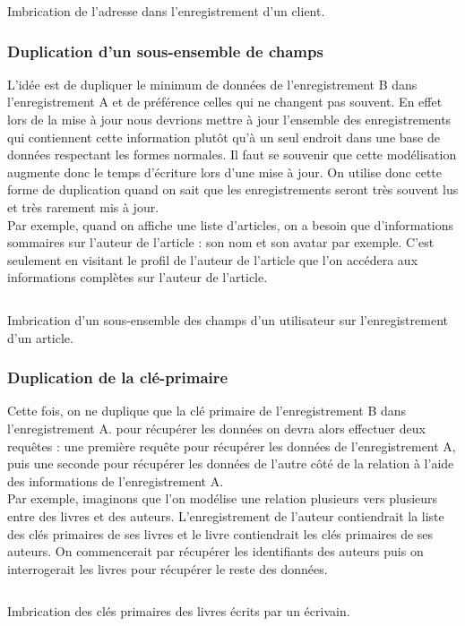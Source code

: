 		\begin{listing}[H]
			\inputminted{json}{code/imbrication.json}
			\caption{Imbrication de l'adresse dans l'enregistrement d'un client.}
		\end{listing}

	\subsubsection{Duplication d'un sous-ensemble de champs}
		L'idée est de dupliquer le minimum de données de l'enregistrement B dans l'enregistrement A et de préférence celles qui ne changent pas souvent. En effet lors de la mise à jour nous devrions mettre à jour l'ensemble des enregistrements qui contiennent cette information plutôt qu'à un seul endroit dans une base de données respectant les formes normales. Il faut se souvenir que cette modélisation augmente donc le temps d'écriture lors d'une mise à jour. On utilise donc cette forme de duplication quand on sait que les enregistrements seront très souvent lus et très rarement mis à jour.\\

		Par exemple, quand on affiche une liste d'articles, on a besoin que d'informations sommaires sur l'auteur de l'article : son nom et son avatar par exemple. C'est seulement en visitant le profil de l'auteur de l'article que l'on accédera aux informations complètes sur l'auteur de l'article.

		\begin{listing}[H]
			\inputminted{json}{code/duplicationSousEnsemble.json}
			\caption{Imbrication d'un sous-ensemble des champs d'un utilisateur sur l'enregistrement d'un article.}
		\end{listing}

	\subsubsection{Duplication de la clé-primaire}
		Cette fois, on ne duplique que la clé primaire de l'enregistrement B dans l'enregistrement A. pour récupérer les données on devra alors effectuer deux requêtes : une première requête pour récupérer les données de l'enregistrement A, puis une seconde pour récupérer les données de l'autre côté de la relation à l'aide des informations de l'enregistrement A.\\

		Par exemple, imaginons que l'on modélise une relation plusieurs vers plusieurs entre des livres et des auteurs. L'enregistrement de l'auteur contiendrait la liste des clés primaires de ses livres et le livre contiendrait les clés primaires de ses auteurs. On commencerait par récupérer les identifiants des auteurs puis on interrogerait les livres pour récupérer le reste des données.

		\begin{listing}[H]
			\inputminted{json}{code/duplicationClesPrimairesLivres.json}
			\caption{Imbrication des clés primaires des livres écrits par un écrivain.}
		\end{listing}